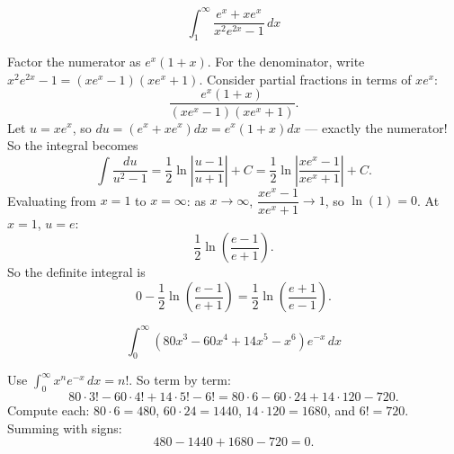\begin{questions}
\question
\[ \int_1^{\infty} \frac{e^x+xe^x}{x^2e^{2x}-1}\,dx \]
\begin{solution}
Factor the numerator as $e^x(1+x)$. For the denominator, write $x^2e^{2x}-1 = (xe^x-1)(xe^x+1)$. Consider partial fractions in terms of $xe^x$:
\[ \frac{e^x(1+x)}{(xe^x-1)(xe^x+1)}. \]
Let $u = xe^x$, so $du = (e^x+xe^x)dx = e^x(1+x)dx$ — exactly the numerator! So the integral becomes
\[ \int \frac{du}{u^2-1} = \frac12\ln\left|\frac{u-1}{u+1}\right| + C = \frac12\ln\left|\frac{xe^x-1}{xe^x+1}\right|+C. \]
Evaluating from $x=1$ to $x=\infty$: as $x\to\infty$, $\dfrac{xe^x-1}{xe^x+1}\to 1$, so $\ln(1)=0$. At $x=1$, $u=e$:
\[ \frac12\ln\left(\frac{e-1}{e+1}\right). \]
So the definite integral is
\[ 0 - \frac12\ln\left(\frac{e-1}{e+1}\right) = \frac12\ln\left(\frac{e+1}{e-1}\right). \]
\end{solution}

\question
\[ \int_0^{\infty} (80x^3-60x^4+14x^5-x^6)e^{-x}\,dx \]
\begin{solution}
Use $\displaystyle\int_0^\infty x^n e^{-x}\,dx = n!$. So term by term:
\[ 80\cdot3! - 60\cdot4! + 14\cdot5! - 6! = 80\cdot6 - 60\cdot24 + 14\cdot120 - 720. \]
Compute each: $80\cdot6=480$, $60\cdot24=1440$, $14\cdot120=1680$, and $6!=720$. Summing with signs:
\[ 480 - 1440 + 1680 - 720 = 0. \]
\end{solution}

\end{questions}

